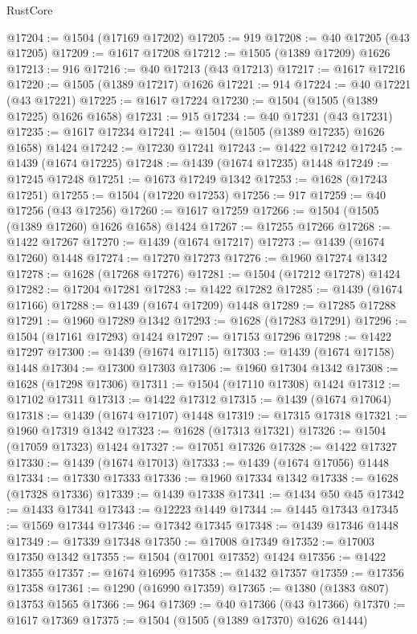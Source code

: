 \begin{lexlean}{RustCore}
\begin{coremodule}
@17204 := @1504 (@17169 @17202)
@17205 := 919
@17208 := @40 @17205 (@43 @17205)
@17209 := @1617 @17208
@17212 := @1505 (@1389 @17209) @1626
@17213 := 916
@17216 := @40 @17213 (@43 @17213)
@17217 := @1617 @17216
@17220 := @1505 (@1389 @17217) @1626
@17221 := 914
@17224 := @40 @17221 (@43 @17221)
@17225 := @1617 @17224
@17230 := @1504 (@1505 (@1389 @17225) @1626 @1658)
@17231 := 915
@17234 := @40 @17231 (@43 @17231)
@17235 := @1617 @17234
@17241 := @1504 (@1505 (@1389 @17235) @1626 @1658) @1424
@17242 := @17230 @17241
@17243 := @1422 @17242
@17245 := @1439 (@1674 @17225)
@17248 := @1439 (@1674 @17235) @1448
@17249 := @17245 @17248
@17251 := @1673 @17249 @1342
@17253 := @1628 (@17243 @17251)
@17255 := @1504 (@17220 @17253)
@17256 := 917
@17259 := @40 @17256 (@43 @17256)
@17260 := @1617 @17259
@17266 := @1504 (@1505 (@1389 @17260) @1626 @1658) @1424
@17267 := @17255 @17266
@17268 := @1422 @17267
@17270 := @1439 (@1674 @17217)
@17273 := @1439 (@1674 @17260) @1448
@17274 := @17270 @17273
@17276 := @1960 @17274 @1342
@17278 := @1628 (@17268 @17276)
@17281 := @1504 (@17212 @17278) @1424
@17282 := @17204 @17281
@17283 := @1422 @17282
@17285 := @1439 (@1674 @17166)
@17288 := @1439 (@1674 @17209) @1448
@17289 := @17285 @17288
@17291 := @1960 @17289 @1342
@17293 := @1628 (@17283 @17291)
@17296 := @1504 (@17161 @17293) @1424
@17297 := @17153 @17296
@17298 := @1422 @17297
@17300 := @1439 (@1674 @17115)
@17303 := @1439 (@1674 @17158) @1448
@17304 := @17300 @17303
@17306 := @1960 @17304 @1342
@17308 := @1628 (@17298 @17306)
@17311 := @1504 (@17110 @17308) @1424
@17312 := @17102 @17311
@17313 := @1422 @17312
@17315 := @1439 (@1674 @17064)
@17318 := @1439 (@1674 @17107) @1448
@17319 := @17315 @17318
@17321 := @1960 @17319 @1342
@17323 := @1628 (@17313 @17321)
@17326 := @1504 (@17059 @17323) @1424
@17327 := @17051 @17326
@17328 := @1422 @17327
@17330 := @1439 (@1674 @17013)
@17333 := @1439 (@1674 @17056) @1448
@17334 := @17330 @17333
@17336 := @1960 @17334 @1342
@17338 := @1628 (@17328 @17336)
@17339 := @1439 @17338
@17341 := @1434 @50 @45
@17342 := @1433 @17341
@17343 := @12223 @1449
@17344 := @1445 @17343
@17345 := @1569 @17344
@17346 := @17342 @17345
@17348 := @1439 @17346 @1448
@17349 := @17339 @17348
@17350 := @17008 @17349
@17352 := @17003 @17350 @1342
@17355 := @1504 (@17001 @17352) @1424
@17356 := @1422 @17355
@17357 := @1674 @16995
@17358 := @1432 @17357
@17359 := @17356 @17358
@17361 := @1290 (@16990 @17359)
@17365 := @1380 (@1383 @807) @13753 @1565
@17366 := 964
@17369 := @40 @17366 (@43 @17366)
@17370 := @1617 @17369
@17375 := @1504 (@1505 (@1389 @17370) @1626 @1444)

\end{coremodule}
\end{lexlean}
